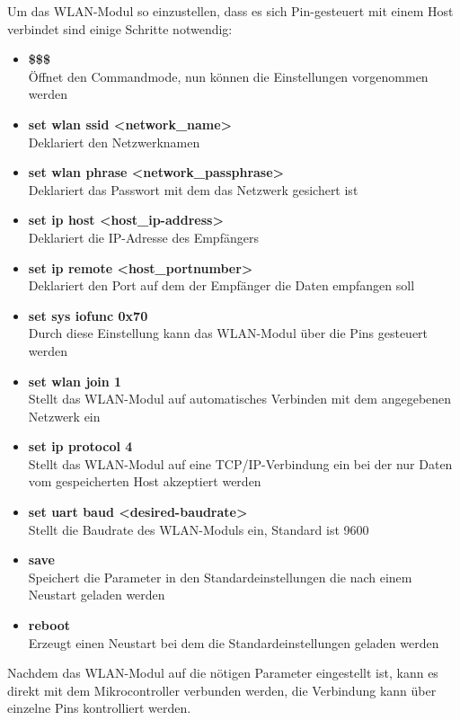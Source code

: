 Um das WLAN-Modul so einzustellen, dass es sich Pin-gesteuert mit einem Host verbindet sind einige Schritte notwendig:
  \begin{itemize}
    \item \textbf{\$\$\$}\\
    Öffnet den Commandmode, nun können die Einstellungen vorgenommen werden
    \item \textbf{set wlan ssid <network\_name>}\\
    Deklariert den Netzwerknamen
    \item \textbf{set wlan phrase <network\_passphrase>}\\
    Deklariert das Passwort mit dem das Netzwerk gesichert ist
    \item \textbf{set ip host <host\_ip-address>}\\
    Deklariert die IP-Adresse des Empfängers
    \item \textbf{set ip remote <host\_portnumber>}\\
    Deklariert den Port auf dem der Empfänger die Daten empfangen soll
    \item \textbf{set sys iofunc 0x70}\\
    Durch diese Einstellung kann das WLAN-Modul über die Pins gesteuert werden
    \item \textbf{set wlan join 1}\\
    Stellt das WLAN-Modul auf automatisches Verbinden mit dem angegebenen Netzwerk ein
    \item \textbf{set ip protocol 4}\\
    Stellt das WLAN-Modul auf eine TCP/IP-Verbindung ein bei der nur Daten vom gespeicherten Host akzeptiert werden
    \item \textbf{set uart baud <desired-baudrate>}\\
    Stellt die Baudrate des WLAN-Moduls ein, Standard ist 9600
    \item \textbf{save}\\
    Speichert die Parameter in den Standardeinstellungen die nach einem Neustart geladen werden
    \item \textbf{reboot}\\
    Erzeugt einen Neustart bei dem die Standardeinstellungen geladen werden
  \end{itemize}
  Nachdem das WLAN-Modul auf die nötigen Parameter eingestellt ist, kann es direkt mit dem Mikrocontroller verbunden werden, die Verbindung kann über einzelne Pins kontrolliert
  werden.

